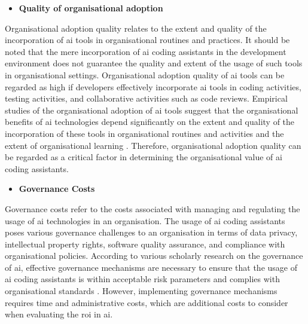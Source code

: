 \begin{itemize}
	\item \textbf{Quality of organisational adoption} 
\end{itemize}
Organisational adoption quality relates to the extent and quality of the incorporation of \gls{ai} tools in organisational routines and practices. It should be noted that the mere incorporation of \gls{ai} coding assistants in the development environment does not guarantee the quality and extent of the usage of such tools in organisational settings. Organisational adoption quality of \gls{ai} tools can be regarded as high if developers effectively incorporate \gls{ai} tools in coding activities, testing activities, and collaborative activities such as code reviews. Empirical studies of the organisational adoption of \gls{ai} tools suggest that the organisational benefits of \gls{ai} technologies depend significantly on the extent and quality of the incorporation of these tools in organisational routines and activities and the extent of organisational learning \autocite{An2024}. Therefore, organisational adoption quality can be regarded as a critical factor in determining the organisational value of \gls{ai} coding assistants.

\begin{itemize}
	\item \textbf{Governance Costs} 
\end{itemize}
Governance costs refer to the costs associated with managing and regulating the usage of \gls{ai} technologies in an organisation. The usage of \gls{ai} coding assistants poses various governance challenges to an organisation in terms of data privacy, intellectual property rights, software quality assurance, and compliance with organisational policies. According to various scholarly research on the governance of \gls{ai}, effective governance mechanisms are necessary to ensure that the usage of \gls{ai} coding assistants is within acceptable risk parameters and complies with organisational standards \autocite{Schneider2023}. However, implementing governance mechanisms requires time and administrative costs, which are additional costs to consider when evaluating the \gls{roi} in \gls{ai}.

